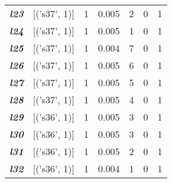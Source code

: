 \begin{table}
\begin{tabular}{llccccc}
    \textit{\textbf{l23}}                                            & {[}('s37', 1){]}    & 1             & 0.005               & 2              & 0              & 1           \\
    \textit{\textbf{l24}}                                            & {[}('s37', 1){]}    & 1             & 0.005               & 1              & 0              & 1           \\
    \textit{\textbf{l25}}                                            & {[}('s37', 1){]}    & 1             & 0.004               & 7              & 0              & 1           \\
    \textit{\textbf{l26}}                                            & {[}('s37', 1){]}    & 1             & 0.005               & 6              & 0              & 1           \\
    \textit{\textbf{l27}}                                            & {[}('s37', 1){]}    & 1             & 0.005               & 5              & 0              & 1           \\
    \textit{\textbf{l28}}                                            & {[}('s37', 1){]}    & 1             & 0.005               & 4              & 0              & 1           \\
    \textit{\textbf{l29}}                                            & {[}('s36', 1){]}    & 1             & 0.005               & 3              & 0              & 1           \\
    \textit{\textbf{l30}}                                            & {[}('s36', 1){]}    & 1             & 0.005               & 3              & 0              & 1           \\
    \textit{\textbf{l31}}                                            & {[}('s36', 1){]}    & 1             & 0.005               & 2              & 0              & 1           \\
    \textit{\textbf{l32}}                                            & {[}('s36', 1){]}    & 1             & 0.004               & 1              & 0              & 1           \\ \hline
    \end{tabular}
    \end{table}